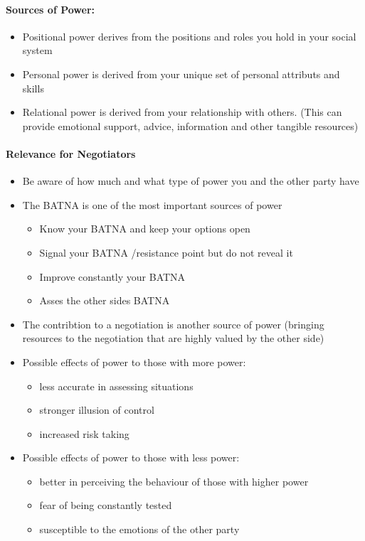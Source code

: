 \paragraph{Sources of Power:}
\begin{itemize}
    \item Positional power derives from the positions and roles you hold in
        your social system
    \item Personal power is derived from your unique set of personal attributs
        and skills
    \item Relational power is derived from your relationship with others.
        (This can provide emotional support, advice, information and other
        tangible resources)
\end{itemize}

\paragraph{Relevance for Negotiators}
\begin{itemize}
    \item Be aware of how much and what type of power you and the other party have
    \item The BATNA is one of the most important sources of power
        \begin{itemize}
            \item Know your BATNA and keep your options open
            \item Signal your BATNA /resistance point but do not reveal it
            \item Improve constantly your BATNA
            \item Asses the other sides BATNA
        \end{itemize}
    \item The contribtion to a negotiation is another source of power (bringing
        resources to the negotiation that are highly valued by the other side)
    \item Possible effects of power to those with more power:
        \begin{itemize}
            \item less accurate in assessing situations
            \item stronger illusion of control
            \item increased risk taking
        \end{itemize}
    \item Possible effects of power to those with less power:
        \begin{itemize}
            \item better in perceiving the behaviour of those with higher power
            \item fear of being constantly tested
            \item susceptible to the emotions of the other party
        \end{itemize}
\end{itemize}

